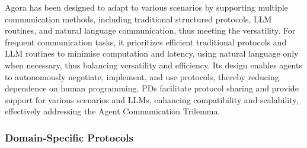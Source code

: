 \documentclass[10pt,preprint]{article}
\begin{document}


Agora has been designed to adapt to various scenarios by supporting multiple communication methods, including traditional structured protocols, LLM routines, and natural language communication, thus meeting the versatility. For frequent communication tasks, it prioritizes efficient traditional protocols and LLM routines to minimise computation and latency, using natural language only when necessary, thus balancing versatility and efficiency. Its design enables agents to autonomously negotiate, implement, and use protocols, thereby reducing dependence on human programming. PDs facilitate protocol sharing and provide support for various scenarios and LLMs, enhancing compatibility and scalability, effectively addressing the Agent Communication Trilemma.






\subsubsection{Domain-Specific Protocols}
\end{document}
